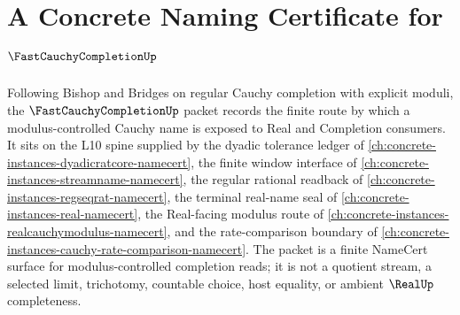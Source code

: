 \chapter{A Concrete Naming Certificate for $\FastCauchyCompletionUp$}
\label{ch:concrete-instances-fast-cauchy-completion-namecert}

Following Bishop and Bridges on regular Cauchy completion with explicit moduli, the $\FastCauchyCompletionUp$ packet records the finite route by which a modulus-controlled Cauchy name is exposed to Real and Completion consumers. It sits on the L10 spine supplied by the dyadic tolerance ledger of \autoref{ch:concrete-instances-dyadicratcore-namecert}, the finite window interface of \autoref{ch:concrete-instances-streamname-namecert}, the regular rational readback of \autoref{ch:concrete-instances-regseqrat-namecert}, the terminal real-name seal of \autoref{ch:concrete-instances-real-namecert}, the Real-facing modulus route of \autoref{ch:concrete-instances-realcauchymodulus-namecert}, and the rate-comparison boundary of \autoref{ch:concrete-instances-cauchy-rate-comparison-namecert}. The packet is a finite NameCert surface for modulus-controlled completion reads; it is not a quotient stream, a selected limit, trichotomy, countable choice, host equality, or ambient $\RealUp$ completeness.

